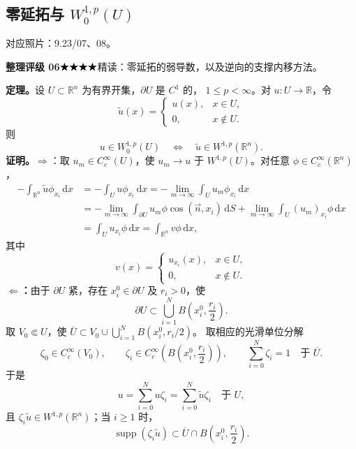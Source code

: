 \documentclass[UTF8,a4paper,11pt,fontset=fandol]{ctexart}
\newcommand{\R}{\mathbb R}
\newcommand{\dd}{\,\mathrm d}
\newcommand{\source}[1]{{\small\color{notegray}对应照片：#1。}\par}
\newcommand{\proofstars}[1]{\ensuremath{%
\ifnum#1>0\relax\bigstar\fi
\ifnum#1>1\relax\bigstar\fi
\ifnum#1>2\relax\bigstar\fi
\ifnum#1>3\relax\bigstar\fi
\ifnum#1>4\relax\bigstar\fi}}
\newcommand{\proofrating}[3]{\par{\small\color{proofblue}%
\textbf{整理评级 #1}\enspace\proofstars{#2}\quad #3\par}}
\begin{document}
\subsection{\texorpdfstring{零延拓与 $W_0^{1,p}(U)$}{零延拓与零边界值空间}}
\source{9.23/07、08}
\proofrating{06}{4}{精读：零延拓的弱导数，以及逆向的支撑内移方法。}
\textbf{定理。}设 $U\subset\R^n$ 为有界开集，$\partial U$ 是 $C^1$ 的，
$1\leq p<\infty$。对 $u:U\to\R$，令
\[
\widetilde u(x)=\begin{cases}u(x),&x\in U,\\0,&x\notin U.\end{cases}
\]
则
\[
\boxed{u\in W_0^{1,p}(U)\quad\Longleftrightarrow\quad
\widetilde u\in W^{1,p}(\R^n).}
\]
\textbf{证明。}$\Longrightarrow$：取 $u_m\in C_c^\infty(U)$，使
$u_m\to u$ 于 $W^{1,p}(U)$。对任意 $\phi\in C_c^\infty(\R^n)$，
\[
\begin{aligned}
-\int_{\R^n}\widetilde u\phi_{x_i}\dd x
&=-\int_Uu\phi_{x_i}\dd x
=-\lim_{m\to\infty}\int_Uu_m\phi_{x_i}\dd x\\
&=-\lim_{m\to\infty}\int_{\partial U}u_m\phi\cos(\vec n,x_i)\dd S
+\lim_{m\to\infty}\int_U(u_m)_{x_i}\phi\dd x\\
&=\int_Uu_{x_i}\phi\dd x=\int_{\R^n}v\phi\dd x,
\end{aligned}
\]
其中
\[
v(x)=\begin{cases}u_{x_i}(x),&x\in U,\\0,&x\notin U.\end{cases}
\]
\textbf{$\Longleftarrow$：}由于 $\partial U$ 紧，存在 $x_i^0\in\partial U$ 及 $r_i>0$，使
\[
\partial U\subset\bigcup_{i=1}^N B\left(x_i^0,\frac{r_i}{2}\right).
\]
取 $V_0\Subset U$，使 $\overline U\subset V_0\cup\bigcup_{i=1}^N B(x_i^0,r_i/2)$。
取相应的光滑单位分解
\[
\zeta_0\in C_c^\infty(V_0),\qquad
\zeta_i\in C_c^\infty\left(B\left(x_i^0,\frac{r_i}{2}\right)\right),\qquad
\sum_{i=0}^N\zeta_i=1\quad\text{于 }\overline U.
\]
于是
\[
u=\sum_{i=0}^N u\zeta_i=\sum_{i=0}^N\widetilde u\zeta_i\quad\text{于 }U,
\]
且 $\zeta_i\widetilde u\in W^{1,p}(\R^n)$；当 $i\geq1$ 时，
\[
\operatorname{supp}(\zeta_i\widetilde u)
\subset\overline U\cap B\left(x_i^0,\frac{r_i}{2}\right).
\]

\newpage
\end{document}
